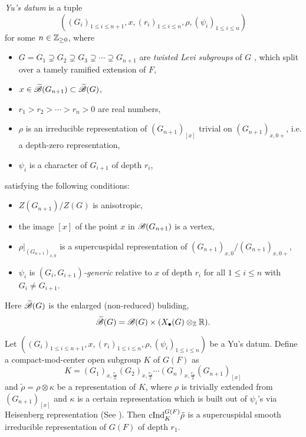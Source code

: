 \begin{definition}[]
\emph{Yu's datum} is a tuple
\begin{equation*}
    ((G_i)_{1 \le i \le n + 1}, x, (r_i)_{1 \le i \le n}, \rho, (\psi_i)_{1 \le i \le n})
\end{equation*}
for some $n \in \mathbb{Z}_{\ge 0}$, where
\begin{itemize}
    \item $G = G_1 \supsetneq G_2 \supsetneq G_3 \supsetneq \cdots \supsetneq G_{n+1}$ are \emph{twisted Levi subgroups} of $G$ \cite[Definition 4.1.1]{fintzen2021representations}, which split over a tamely ramified extension of $F$,
    \item $x \in \widetilde{\mathscr{B}}(G_{n+1}) \subset \widetilde{\mathscr{B}}(G)$,
    \item $r_1 > r_2 > \cdots > r_n > 0$ are real numbers,
    \item $\rho$ is an irreducible representation of $(G_{n+1})_{[x]}$ trivial on $(G_{n+1})_{x, 0+}$, i.e. a depth-zero representation,
    \item $\psi_i$ is a character of $G_{i + 1}$ of depth $r_i$,
\end{itemize}
satisfying the following conditions:
\begin{itemize}
    \item $Z(G_{n+1}) / Z(G)$ is anisotropic,
    \item the image $[x]$ of the point $x$ in $\mathscr{B}(G_{n+1})$ is a vertex,
    \item $\rho|_{(G_{n+1})_{x, 0}}$ is a supercuspidal representation of $(G_{n+1})_{x, 0} / (G_{n+1})_{x, 0+}$,
    \item $\psi_i$ is \emph{$(G_i, G_{i+1})$-generic} relative to $x$ of depth $r_i$ \cite[Definition 4.1.3]{fintzen2021representations} for all $1 \le i \le n$ with $G_{i} \ne G_{i+1}$.
\end{itemize}
\end{definition}

Here $\widetilde{\mathscr{B}}(G)$ is the enlarged (non-reduced) buliding,
\[
    \widetilde{\mathscr{B}}(G) = \mathscr{B}(G) \times (X_{\bullet}(G) \otimes_{\mathbb{Z}} \mathbb{R}).
\]


\begin{theorem}
\label{thm:yu}
Let $((G_i)_{1 \le i \le n + 1}, x, (r_i)_{1 \le i \le n}, \rho, (\psi_i)_{1 \le i \le n})$ be a Yu's datum.
Define a compact-mod-center open subgroup $K$ of $G(F)$ as
\[
    K = (G_1)_{x, \frac{r_1}{2}} (G_2)_{x, \frac{r_2}{2}} \cdots (G_n)_{x, \frac{r_n}{2}} (G_{n+1})_{[x]}
\]
and $\tilde{\rho} = \rho \otimes \kappa$ be a representation of $K$, where $\rho$ is trivially extended from $(G_{n+1})_{[x]}$ and $\kappa$ is a certain representation which is built out of $\psi_i$'s via Heisenberg representation (See \cite[Section 3.8]{fintzensupercuspidal}).
Then $\mathrm{cInd}_{K}^{G(F)} \tilde{\rho}$ is a supercuspidal smooth irreducible representation of $G(F)$ of depth $r_1$.
\end{theorem}


